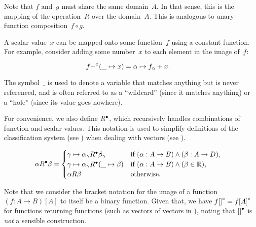 \indexsym{}
Note that $f$ and~$g$ must share the same domain~$A$.
In that sense,
  this is the mapping of the operation~$R$ over the domain~$A$.
This is analogous to unary function composition~$f\circ g$.

A scalar value~$x$ can be mapped onto some function~$f$ using a constant
  function.
For example,
  consider adding some number~$x$ to each element in the image of~$f$:

\begin{equation*}
  f {+}^\circ (\_\mapsto x) = \alpha \mapsto f_\alpha + x.
\end{equation*}

The symbol~$\_$ is used to denote a variable that matches anything but is
  never referenced,
    and is often referred to as a ``wildcard'' (since it matches anything)
    or a ``hole'' (since its value goes nowhere).

For convenience,
  we also define ${R}^\bullet$,
  which recursively handles combinations of function and scalar values.
This notation is used to simplify definitions of the classification system
  (see )
  when dealing with vectors
    (see ).

\begin{equation}\label{eq:bicompi}
  \alpha {R}^\bullet \beta =
    \begin{cases}
      \gamma \mapsto \alpha_\gamma {R}^\bullet \beta_\gamma
        &\text{if } (\alpha : A\rightarrow B) \land (\beta : A\rightarrow D),\\
      \gamma \mapsto \alpha_\gamma {R}^\bullet (\_ \mapsto \beta)
        &\text{if } (\alpha : A\rightarrow B) \land (\beta \in\mathbb{R}),\\
      \alpha R \beta &\text{otherwise}.
    \end{cases}
\end{equation}

Note that we consider the bracket notation for the image of a function
  $(f:A\rightarrow B)[A]$ to itself be a binary function.
Given that, we have $f{[]}^\circ = f{[A]}^\circ$ for functions returning
  functions (such as vectors of vectors in ),
    noting that ${[]}^\bullet$ is \emph{not} a sensible construction.


